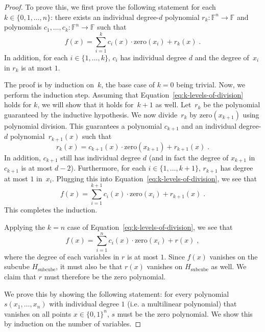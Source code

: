 \documentclass[11pt]{article}
\theoremstyle{definition}
\newcommand{\F}{\ensuremath{\mathbb{F}}}
\begin{document}
  \begin{proof}
    To prove this, we first prove the following statement for each $k \in \{0,
    1, \ldots, n\}$: there exists an individual degree-$d$ polynomial $r_k:\F^{n}
    \rightarrow \F$ and polynomials $c_1, \ldots, c_k:\F^n \rightarrow \F$ such
    that
  \begin{equation}\label{eq:k-levels-of-division}
  f(x) = \sum_{i=1}^k c_i(x) \cdot \mathrm{zero}(x_i) + r_k(x)\;.
  \end{equation}
  In addition, for each $i \in \{1, \ldots, k\}$, $c_i$ has individual degree
  $d$ and the degree of~$x_i$ in $r_k$ is at most $1$.
  
  The proof is by induction on~$k$, the base case of $k = 0$ being trivial.
  Now, we perform the induction step.
  Assuming that Equation~\eqref{eq:k-levels-of-division} holds for $k$, we will
  show that it holds for~$k+1$ as well.
  Let~$r_k$ be the polynomial guaranteed by the inductive hypothesis.
  We now divide~$r_k$ by $\mathrm{zero}(x_{k+1})$ using polynomial
  division.
  This guarantees a polynomial $c_{k+1}$ and an individual degree-$d$
  polynomial~$r_{k+1}(x)$ such that
  \begin{equation*}
  r_k(x) = c_{k+1}(x) \cdot \mathrm{zero}(x_{k+1}) + r_{k+1}(x)\;.
  \end{equation*}
  In addition, $c_{k+1}$ still has individual degree $d$ (and in fact the degree
  of $x_{k+1}$ in $c_{k+1}$ is at most $d - 2$).
  Furthermore, for each $i \in \{1, \ldots, k+1\}$, $r_{k+1}$ has degree at most
  $1$ in~$x_i$.
  Plugging this into Equation~\eqref{eq:k-levels-of-division}, we see that
  \begin{equation}\label{eq:almost-there}
  f(x) = \sum_{i=1}^{k+1} c_i(x) \cdot \mathrm{zero}(x_i) + r_{k+1}(x)\;.  
  \end{equation}
  This completes the induction.
  
  Applying the $k = n$ case of Equation~\eqref{eq:k-levels-of-division}, we see
  that
  \begin{equation}\label{eq:case-n-of-induction}
  f(x) = \sum_{i=1}^n c_i(x) \cdot \mathrm{zero}(x_i) + r(x)\;,
  \end{equation}
  where the degree of each variables in $r$ is at most $1$.
  Since $f(x)$ vanishes on the subcube $H_{\mathrm{subcube}}$, it must also be
  that $r(x)$ vanishes on $H_{\mathrm{subcube}}$ as well.
  We claim that $r$ must therefore be the zero polynomial.
  
  We prove this by showing the following statement: for every polynomial
  $s(x_1,\ldots,x_n)$ with individual degree $1$ (i.e.
  a multilinear polynomial) that vanishes on all points $x \in \{0,1\}^n$, $s$
  must be the zero polynomial.
  We show this by induction on the number of variables.
  

\end{proof}
\end{document}
